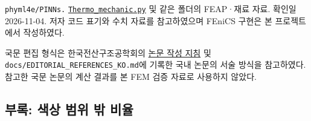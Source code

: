 \documentclass[10pt,a4paper]{article}
\renewcommand{\arraystretch}{1.25}
\begin{document}
{\small\color{muted} \nolinkurl{phyml4e/PINNs.} \href{https://github.com/phyml4e/PINNs/blob/5b426dc8eb2255b1bb3b8630619228b36cdb464e/Thermomechanic/Thermo_mechanic.py}{\nolinkurl{Thermo_mechanic.py}} 및 같은 폴더의 FEAP·재료 자료. 확인일 2026-11-04. 저자 코드 표기와 수치 자료를 참고하였으며 FEniCS 구현은 본 프로젝트에서 작성하였다.\par}

{\small\color{muted} 국문 편집 형식은 한국전산구조공학회의 \href{https://www.jcoseik.or.kr/journal-information/instructions-for-authors/}{논문 작성 지침} 및 \nolinkurl{docs/EDITORIAL_REFERENCES_KO.md}에 기록한 국내 논문의 서술 방식을 참고하였다. 참고한 국문 논문의 계산 결과를 본 FEM 검증 자료로 사용하지 않았다.\par}

\subsection{부록: 색상 범위 밖 비율}

\begingroup\fontsize{8}{10.5}\selectfont\renewcommand{\arraystretch}{1.1}
\end{document}
